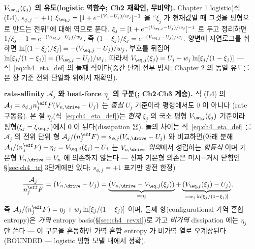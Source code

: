 \textbf{$V_{\eq,j}(\xi_j)$ 의 유도(logistic 역함수; Ch2 재확인, 무비약).} Chapter 1 logistic(식 (L4),
$s_{\phi,j}=+1$) $\xi_{\eq,j}=[1+e^{-(V_n-U_j)/w_j}]^{-1}$ 을 ``$\xi_j$ 가 현재값일 때 그것을 평형으로 만드는
전위''에 대해 역으로 푼다. $\xi_j=[1+e^{-(V_{\eq,j}-U_j)/w_j}]^{-1}$ 로 두고 정리하면 $1/\xi_j-1=
e^{-(V_{\eq,j}-U_j)/w_j}$, 즉 $(1-\xi_j)/\xi_j=e^{-(V_{\eq,j}-U_j)/w_j}$. 양변에 자연로그를 취하면
$\ln[(1-\xi_j)/\xi_j]=-(V_{\eq,j}-U_j)/w_j$, 부호를 뒤집어 $\ln[\xi_j/(1-\xi_j)]=(V_{\eq,j}-U_j)/w_j$, 따라서
$V_{\eq,j}(\xi_j)=U_j+w_j\ln[\xi_j/(1-\xi_j)]$ — 식~\eqref{eq:ch4_eta_def} 의 둘째 식이다(중간 단계 전부 명시;
Chapter 2 의 동일 유도를 본 장 기준 전위 단일화 위에서 재확인).
\begin{boundbox}
\textbf{rate-affinity $\mathcal A_j$ 와 heat-force $\eta_j$ 의 구분(; Ch2$\cdot$Ch3 계승).} 식 (L4) 의
$\mathcal A_j=s_{\phi,j}n_j^{\eff}F(V_{n,\drive}-U_j)$ 는 \emph{중심} $U_j$ 기준이라 평형에서도 0 이 아니다
(rate 구동용). 본 절 $\eta_j$(식~\eqref{eq:ch4_eta_def})는 \emph{현재} $\xi_j$ 의 국소 평형 $V_{\eq,j}(\xi_j)$
기준이라 평형($\xi_j=\xi_{\eq,j}$)에서 0 이 된다(dissipation 용). 둘의 차이는 식~\eqref{eq:ch4_eta_def} 를
$\mathcal A_j$ 의 전위 단위 형 $\mathcal A_j/(n_j^{\eff}F)=s_{\phi,j}(V_{n,\drive}-U_j)$ 와 비교하면(아래 분해
$\mathcal A_j/(n_j^{\eff}F)-\eta_j=V_{\eq,j}(\xi_j)-U_j$ 는 $V_{n,\drive}$ \emph{임의}에서 성립하는 \emph{항등식}
이며 기본형 $V_{n,\drive}=V_n$ 에 의존하지 않는다 — 진짜 기본형 의존은 미시=거시 닫힘인 \S\ref{sec:ch4_tr}
3단계에만 있다; $s_{\phi,j}=+1$ 표기만 방전 한정)
\[
\frac{\mathcal A_j}{n_j^{\eff}F}=(V_{n,\drive}-U_j)
=\underbrace{(V_{n,\drive}-V_{\eq,j}(\xi_j))}_{=\eta_j}
+\underbrace{(V_{\eq,j}(\xi_j)-U_j)}_{=w_j\ln[\xi_j/(1-\xi_j)]},
\]
즉 $\mathcal A_j/(n_j^{\eff}F)=\eta_j+w_j\ln[\xi_j/(1-\xi_j)]$ 이며, 둘째 항(configurational 가역 혼합 entropy)은
\emph{가역} entropy basis(\S\ref{sec:ch4_revxi})로 가고 \emph{비가역} dissipation 에는 $\eta_j$ 만 쓴다 — 이
구분을 혼동하면 가역 혼합 entropy 가 비가역 열로 오계상된다(BOUNDED — logistic 평형 모델 내에서 정확).
\end{boundbox}

